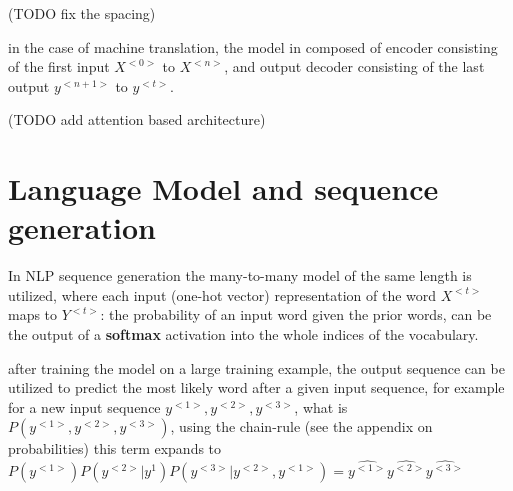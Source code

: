 \documentclass[4apaper,12pt]{book}
\begin{document}
\begin{description}
\begin{description}
\begin{description}
\begin{description}
          \item (TODO fix the spacing)
        \item in the case of machine translation, the model in composed of encoder consisting of the first input $X^{<0>}$ to $X^{<n>}$, and output decoder consisting of the last output $y^{<n+1>}$ to $y^{<t>}$.
        \end{description}
      \item (TODO add attention based architecture)

      \end{description}

    \end{description}

    \section{Language Model and sequence generation}
    \begin{description}
    \item In NLP sequence generation the many-to-many model of the same length is utilized, where each input (one-hot vector) representation of the word $X^{<t>}$ maps to $Y^{<t>}$: the probability of an input word given the prior words, can be the output of a \textbf{softmax} activation into the whole indices of the vocabulary.
    \item after training the model on a large training example, the output sequence can be utilized to predict the most likely word after a given input sequence, for example for a new input sequence $y^{<1>}, y^{<2>}, y^{<3>}$, what is $P(y^{<1>}, y^{<2>}, y^{<3>})$, using the chain-rule (see the appendix on probabilities) this term expands to $P(y^{<1>})P(y^{<2>}|y^{1})P(y^{<3>}|y^{<2>},y^{<1>})=\hat{y^{<1>}}\hat{y^{<2>}}\hat{y^{<3>}}$
    \end{description}

\end{description}
\end{document}
